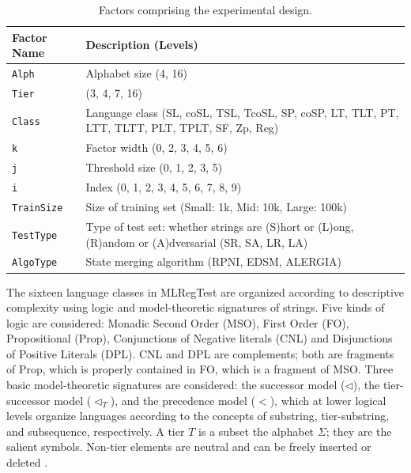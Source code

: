 \documentclass[twoside,11pt]{article}
\newcommand{\ttt}[1]{\texttt{#1}}
\newcommand{\tttx}[1]{\ttt{#1}\xspace}
\newcommand{\Alpha}{\tttx{Alph}}
\newcommand{\Tier}{\tttx{Tier}}
\newcommand{\Class}{\tttx{Class}}
\newcommand{\kay}{\tttx{k}}
\newcommand{\jay}{\tttx{j}}
\newcommand{\eye}{\tttx{i}}
\newcommand{\TrainSize}{\tttx{TrainSize}}
\newcommand{\TestType}{\tttx{TestType}}
\newcommand{\AlgoType}{\tttx{AlgoType}}
\begin{document}
\begin{table}[!t]
    \centering
    \begin{tabular}{l p{10cm}}
        \toprule
        Factor Name & Description (Levels)                                                                                \\
        \midrule
        \Alpha      & Alphabet size (4, 16)                                                                               \\
        \Tier       & (3, 4, 7, 16)                                                                                       \\
        \Class      & Language class (SL, coSL, TSL, TcoSL, SP, coSP, LT, TLT, PT, LTT, TLTT, PLT, TPLT, SF, Zp, Reg)     \\
        \kay        & Factor width (0, 2, 3, 4, 5, 6)                                                                     \\
        \jay        & Threshold size (0, 1, 2, 3, 5)                                                                      \\
        \eye        & Index (0, 1, 2, 3, 4, 5, 6, 7, 8, 9)                                                                \\
        \TrainSize  & Size of training set (Small: 1k, Mid: 10k, Large: 100k)                                             \\
        \TestType   & Type of test set: whether strings are (S)hort or (L)ong, (R)andom or (A)dversarial (SR, SA, LR, LA) \\
        \AlgoType   & State merging algorithm (RPNI, EDSM, ALERGIA)                                                       \\
        \bottomrule
    \end{tabular}
    \caption{Factors comprising the experimental design.}
    \label{tab:variables-table}
\end{table}

The sixteen language classes in MLRegTest are organized according to descriptive complexity using logic and model-theoretic signatures of strings.
Five kinds of logic are considered: Monadic Second Order (MSO), First Order (FO), Propositional (Prop), Conjunctions of Negative literals (CNL) and Disjunctions of Positive Literals (DPL).
CNL and DPL are complements; both are fragments of Prop, which is properly contained in FO, which is a fragment of MSO.
Three basic model-theoretic signatures are considered: the successor model ($\triangleleft$), the tier-successor model ($\triangleleft_T$), and the precedence model ($<$), which at lower logical levels organize languages according to the concepts of substring, tier-substring, and subsequence, respectively.
A tier $T$ is a subset the alphabet $\Sigma$; they are the salient symbols. Non-tier elements are neutral and can be freely inserted or deleted \citep{Lambert2023}.
\end{document}
